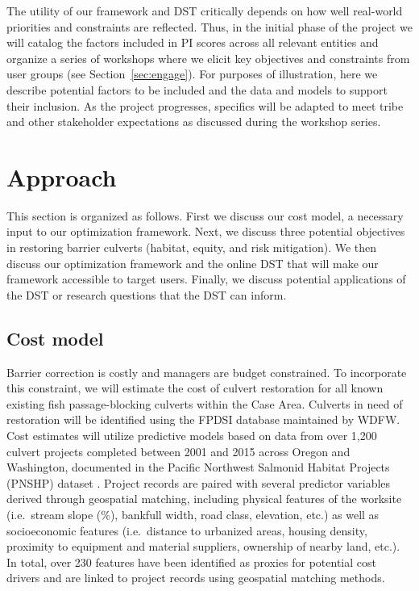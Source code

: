 \documentclass[12pt]{elsarticle}
\begin{document}
The utility of our framework and DST critically depends on how well real-world priorities and constraints are reflected. Thus, in the initial phase of the project we will catalog the factors included in PI scores across all relevant entities and organize a series of workshops where we elicit key objectives and constraints from user groups (see Section~\ref{sec:engage}). For purposes of illustration, here we describe potential factors to be included and the data and models to support their inclusion. As the project progresses, specifics will be adapted to meet tribe and other stakeholder expectations as discussed during the workshop series.  

%
\section{Approach}

This section is organized as follows. First we discuss our cost model, a necessary input to our optimization framework. Next, we discuss three potential objectives in restoring barrier culverts (habitat, equity, and risk mitigation). We then discuss our optimization framework and the online DST that will make our framework accessible to target users. Finally, we discuss potential applications of the DST or research questions that the DST can inform.

\subsection*{Cost model \label{sec:cost}}

Barrier correction is costly and managers are budget constrained. To incorporate this constraint, we will estimate the cost of culvert restoration for all known existing fish passage-blocking culverts within the Case Area. Culverts in need of restoration will be identified using the FPDSI database maintained by WDFW. Cost estimates will utilize predictive models based on data from over 1,200 culvert projects completed between 2001 and 2015 across Oregon and Washington, documented in the Pacific Northwest Salmonid Habitat Projects (PNSHP) dataset \citep{katz_freshwater_2007, noauthor_pacific_2021}. Project records are paired with several predictor variables derived through geospatial matching, including physical features of the worksite (i.e.\ stream slope (\%), bankfull width, road class, elevation, etc.) as well as socioeconomic features (i.e.\ distance to urbanized areas, housing density, proximity to equipment and material suppliers, ownership of nearby land, etc.). In total, over 230 features have been identified as proxies for potential cost drivers and are linked to project records using geospatial matching methods. 
\end{document}
